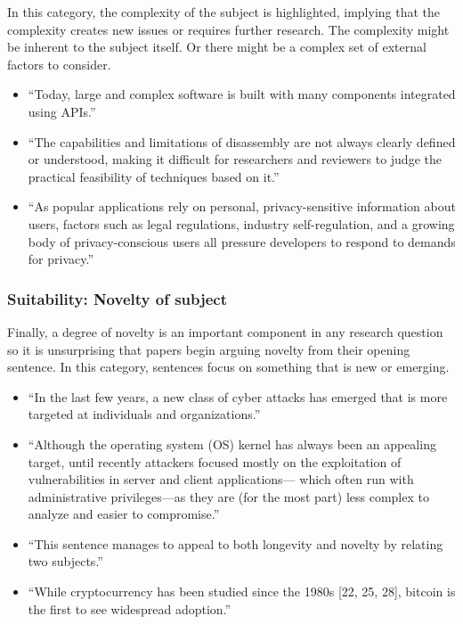 \documentclass[sigconf,anonymous]{acmart}
\begin{document}
	In this category, the complexity of the subject is highlighted, implying that the complexity creates new issues or requires further research. The complexity might be inherent to the subject itself. Or there might be a complex set of external factors to consider.
	\begin{itemize}
		\item 	``Today, large and complex software is built with many components integrated using APIs.''
		
		\item ``The capabilities and limitations of disassembly are not always clearly defined or understood, making it difficult for researchers and reviewers to judge the practical feasibility of techniques based on it.''
		
		\item 	``As popular applications rely on personal, privacy-sensitive information about users, factors such as legal regulations, industry self-regulation, and a growing body of privacy-conscious users all pressure developers to respond to demands for privacy.''
	\end{itemize}
	
	
	\subsubsection{Suitability: Novelty of subject}
	
	Finally, a degree of novelty is an important component in any research question so it is unsurprising that papers begin arguing novelty from their opening sentence. In this category, sentences focus on something that is new or emerging. 
	\begin{itemize}
		\item 	``In the last few years, a new class of cyber attacks has emerged that is more targeted at individuals and organizations.''
		
		\item  ``Although the operating system (OS) kernel has always been an appealing target, until recently attackers focused mostly on the exploitation of vulnerabilities in server and client applications— which often run with administrative privileges—as they are (for the most part) less complex to analyze and easier to compromise.''
		
		\item 	``This sentence manages to appeal to both longevity and novelty by relating two subjects.''
		
		\item  ``While cryptocurrency has been studied since the 1980s [22, 25, 28], bitcoin is the first to see widespread adoption.''
		
	\end{itemize}
	
\end{document}
